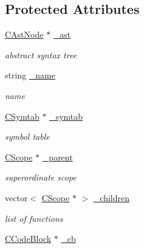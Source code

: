 \subsection*{Protected Attributes}
\begin{DoxyCompactItemize}
\item 
\hypertarget{classCScope_a1c6c46649b8bdc70fa8b65aa072c556e}{\hyperlink{classCAstNode}{C\-Ast\-Node} $\ast$ \hyperlink{classCScope_a1c6c46649b8bdc70fa8b65aa072c556e}{\-\_\-ast}}\label{classCScope_a1c6c46649b8bdc70fa8b65aa072c556e}

\begin{DoxyCompactList}\small\item\em abstract syntax tree \end{DoxyCompactList}\item 
\hypertarget{classCScope_afce3d4c7485f09b0ba1fa133fb27b92b}{string \hyperlink{classCScope_afce3d4c7485f09b0ba1fa133fb27b92b}{\-\_\-name}}\label{classCScope_afce3d4c7485f09b0ba1fa133fb27b92b}

\begin{DoxyCompactList}\small\item\em name \end{DoxyCompactList}\item 
\hypertarget{classCScope_a4015b3caeb2296c71f821e9159a892bb}{\hyperlink{classCSymtab}{C\-Symtab} $\ast$ \hyperlink{classCScope_a4015b3caeb2296c71f821e9159a892bb}{\-\_\-symtab}}\label{classCScope_a4015b3caeb2296c71f821e9159a892bb}

\begin{DoxyCompactList}\small\item\em symbol table \end{DoxyCompactList}\item 
\hypertarget{classCScope_a04b62cb6718802dbd0209670959c25ed}{\hyperlink{classCScope}{C\-Scope} $\ast$ \hyperlink{classCScope_a04b62cb6718802dbd0209670959c25ed}{\-\_\-parent}}\label{classCScope_a04b62cb6718802dbd0209670959c25ed}

\begin{DoxyCompactList}\small\item\em superordinate scope \end{DoxyCompactList}\item 
\hypertarget{classCScope_ac09bab9bcd6431ad5755f3bc45d38849}{vector$<$ \hyperlink{classCScope}{C\-Scope} $\ast$ $>$ \hyperlink{classCScope_ac09bab9bcd6431ad5755f3bc45d38849}{\-\_\-children}}\label{classCScope_ac09bab9bcd6431ad5755f3bc45d38849}

\begin{DoxyCompactList}\small\item\em list of functions \end{DoxyCompactList}\item 
\hypertarget{classCScope_a9f054d93eb89070bae507d736f43404d}{\hyperlink{classCCodeBlock}{C\-Code\-Block} $\ast$ \hyperlink{classCScope_a9f054d93eb89070bae507d736f43404d}{\-\_\-cb}}\label{classCScope_a9f054d93eb89070bae507d736f43404d}


\end{DoxyCompactItemize}
